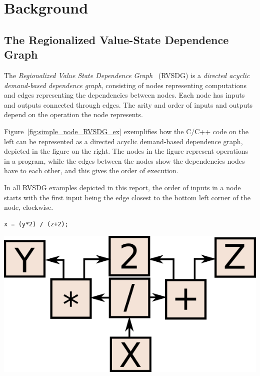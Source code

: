 
\clearpage
\section{Background}
\label{background}

\subsection{The Regionalized Value-State Dependence Graph}
\label{background:RVSDG}

The \textit{Regionalized Value State Dependence Graph}~\cite{RVSDG:HiPEACpaper}
(RVSDG) is a \textit{directed acyclic demand-based dependence graph},
consisting of nodes representing computations and edges representing the
dependencies between nodes. Each node has inputs and outputs connected through
edges. The arity and order of inputs and outputs depend on the operation the
node represents.

Figure~\ref{fig:simple_node_RVSDG_ex} exemplifies how the C/C++ code on the left
can be represented as a directed acyclic demand-based dependence graph, depicted
in the figure on the right. The nodes in the figure represent operations in a
program, while the edges between the nodes show the dependencies nodes have to
each other, and this gives the order of execution.

In all RVSDG examples depicted in this report, the order of inputs in a node
starts with the first input being the edge closest to the bottom left corner of
the node, clockwise.

\begin{centering}
	\noindent\begin{minipage}{0.36\textwidth}
		\begin{CenteredBox}
		\begin{lstlisting}[label={lst:simple_node_RVSDG_ex},
style=minipage_customcpp, basicstyle=\fontsize{14}{1}]
x = (y*2) / (z+2);
		\end{lstlisting}
		\end{CenteredBox}
	\end{minipage}
	\noindent\begin{minipage}{0.55\textwidth}
		\captionsetup{type=figure}
		\includegraphics[width=\textwidth]{figures/simple_node_RVSDG_ex}
	\end{minipage}
	\label{fig:simple_node_RVSDG_ex}
\end{centering}

